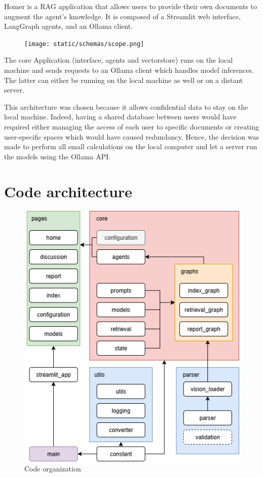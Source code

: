 \documentclass[11pt,a4paper]{report}
\begin{document}
Homer is a RAG application that allows users to provide their own documents to augment the agent's knowledge. It is composed of a Streamlit web interface, LangGraph agents, and an Ollama client.

\begin{figure}[H]
    \centering
    \texttt{[image: static/schemas/scope.png]}
    \label{fig:scope}
\end{figure}

The core Application (interface, agents and vectorstore) runs on the local machine and sends requests to an Ollama client which handles model inferences. The latter can either be running on the local machine as well or on a distant server.

This architecture was chosen because it allows confidential data to stay on the local machine. Indeed, having a shared database between users would have required either managing the access of each user to specific documents or creating user-specific spaces which would have caused redundancy. Hence, the decision was made to perform all small calculations on the local computer and let a server run the models using the Ollama API.

\section{Code architecture}

\begin{figure}[H]
    \centering
    \includegraphics[width=0.7\linewidth]{static/schemas/projectOverview.drawio.png}
    \caption{Code organization}
    \label{fig:overview}
\end{figure}
\end{document}

